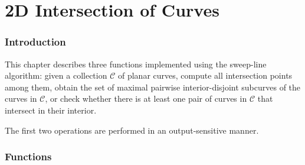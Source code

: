 \chapter{2D Intersection of Curves}

\subsection*{Introduction}

This chapter describes three functions implemented using the
sweep-line algorithm: given a collection ${\mathcal C}$ of 
planar curves, compute all intersection points among them,
obtain the set of maximal pairwise interior-disjoint subcurves
of the curves in ${\mathcal C}$, or check whether there is at
least one pair of curves in ${\mathcal C}$ that intersect in
their interior.

The first two operations are performed in an output-sensitive
manner.

\subsection*{Functions}

\\
\\
